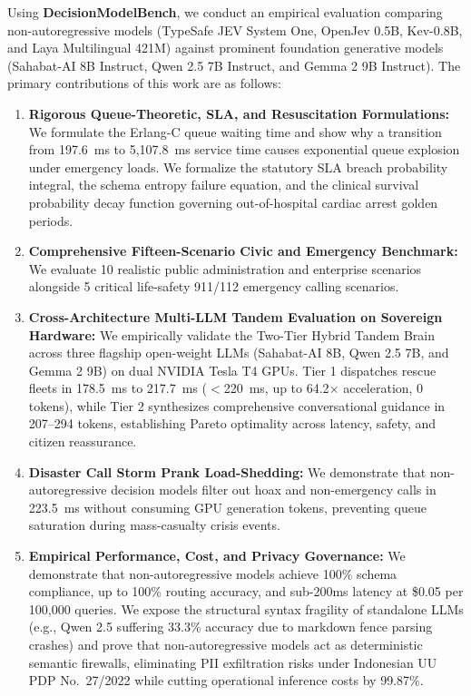 \documentclass[journal,compsoc]{IEEEtran}
\begin{document}
Using \textbf{DecisionModelBench}, we conduct an empirical evaluation comparing non-autoregressive models (TypeSafe JEV System One, OpenJev 0.5B, Kev-0.8B, and Laya Multilingual 421M) against prominent foundation generative models (Sahabat-AI 8B Instruct, Qwen 2.5 7B Instruct, and Gemma 2 9B Instruct). The primary contributions of this work are as follows:
\begin{enumerate}
    \item \textbf{Rigorous Queue-Theoretic, SLA, and Resuscitation Formulations:} We formulate the Erlang-C queue waiting time and show why a transition from 197.6~ms to 5,107.8~ms service time causes exponential queue explosion under emergency loads. We formalize the statutory SLA breach probability integral, the schema entropy failure equation, and the clinical survival probability decay function governing out-of-hospital cardiac arrest golden periods.
    \item \textbf{Comprehensive Fifteen-Scenario Civic and Emergency Benchmark:} We evaluate 10 realistic public administration and enterprise scenarios alongside 5 critical life-safety 911/112 emergency calling scenarios.
    \item \textbf{Cross-Architecture Multi-LLM Tandem Evaluation on Sovereign Hardware:} We empirically validate the Two-Tier Hybrid Tandem Brain across three flagship open-weight LLMs (Sahabat-AI 8B, Qwen 2.5 7B, and Gemma 2 9B) on dual NVIDIA Tesla T4 GPUs. Tier 1 dispatches rescue fleets in 178.5~ms to 217.7~ms ($<$220~ms, up to 64.2$\times$ acceleration, 0 tokens), while Tier 2 synthesizes comprehensive conversational guidance in 207--294 tokens, establishing Pareto optimality across latency, safety, and citizen reassurance.
    \item \textbf{Disaster Call Storm Prank Load-Shedding:} We demonstrate that non-autoregressive decision models filter out hoax and non-emergency calls in 223.5~ms without consuming GPU generation tokens, preventing queue saturation during mass-casualty crisis events.
    \item \textbf{Empirical Performance, Cost, and Privacy Governance:} We demonstrate that non-autoregressive models achieve 100\% schema compliance, up to 100\% routing accuracy, and sub-200ms latency at \$0.05 per 100,000 queries. We expose the structural syntax fragility of standalone LLMs (e.g., Qwen 2.5 suffering 33.3\% accuracy due to markdown fence parsing crashes) and prove that non-autoregressive models act as deterministic semantic firewalls, eliminating PII exfiltration risks under Indonesian UU PDP No.~27/2022 while cutting operational inference costs by 99.87\%.
\end{enumerate}
\end{document}
